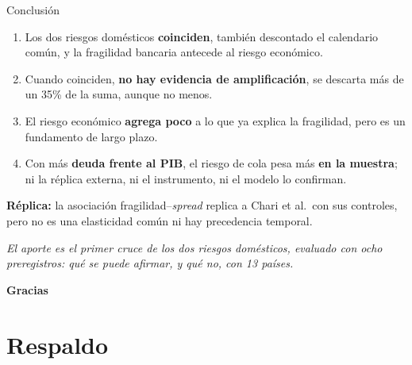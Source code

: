 \documentclass[aspectratio=169]{beamer}
\begin{document}
\begin{frame}{Conclusión}
\vspace{4pt}
\begin{enumerate}
\item Los dos riesgos domésticos \textbf{coinciden}, también descontado el calendario común, y la fragilidad bancaria antecede al riesgo económico.
\vspace{4pt}
\item Cuando coinciden, \textbf{no hay evidencia de amplificación}, se descarta más de un 35\% de la suma, aunque no menos.
\vspace{4pt}
\item El riesgo económico \textbf{agrega poco} a lo que ya explica la fragilidad, pero es un fundamento de largo plazo.
\vspace{4pt}
\item Con más \textbf{deuda frente al PIB}, el riesgo de cola pesa más \textbf{en la muestra}; ni la réplica externa, ni el instrumento, ni el modelo lo confirman.
\end{enumerate}
\vspace{4pt}
{\small \textbf{Réplica:} la asociación fragilidad--\textit{spread} replica a Chari et al.\ con sus controles, pero no es una elasticidad común ni hay precedencia temporal.\par}
\vspace{6pt}
\centering
\textit{El aporte es el primer cruce de los dos riesgos domésticos, evaluado con ocho preregistros: qué se puede afirmar, y qué no, con 13 países.}
\end{frame}

\begin{frame}
\vfill
\centering
{\Huge\bfseries\color{tesisblue} Gracias}
\vfill
\end{frame}

\appendix
\section{Respaldo}
\end{document}
